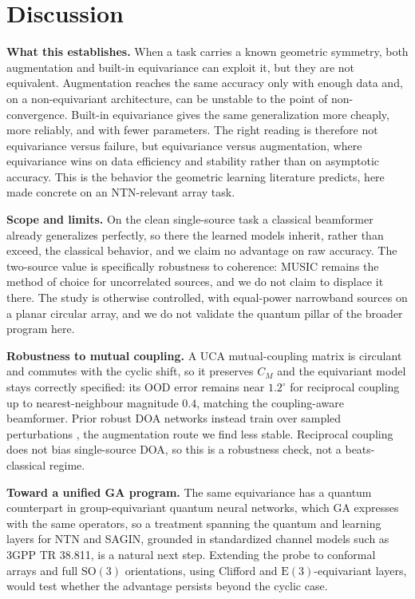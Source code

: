 \documentclass[conference]{IEEEtran}
\begin{document}
\section{Discussion}
\textbf{What this establishes.} When a task carries a known geometric symmetry,
both augmentation and built-in equivariance can exploit it, but they are not
equivalent. Augmentation reaches the same accuracy only with enough data and, on a
non-equivariant architecture, can be unstable to the point of non-convergence.
Built-in equivariance gives the same generalization more cheaply, more reliably,
and with fewer parameters. The right reading is therefore not equivariance versus
failure, but equivariance versus augmentation, where equivariance wins on data
efficiency and stability rather than on asymptotic accuracy. This is the behavior
the geometric learning literature predicts, here made concrete on an NTN-relevant
array task.

\textbf{Scope and limits.} On the clean single-source task a classical beamformer
already generalizes perfectly, so there the learned models inherit, rather than
exceed, the classical behavior, and we claim no advantage on raw accuracy. The
two-source value is specifically robustness to coherence: MUSIC remains the method of
choice for uncorrelated sources, and we do not claim to displace it there. The study
is otherwise controlled, with equal-power narrowband sources on a planar circular
array, and we do not validate the quantum pillar of the broader program here.

\textbf{Robustness to mutual coupling.} A UCA mutual-coupling matrix is circulant
and commutes with the cyclic shift, so it preserves $C_M$ and the equivariant model
stays correctly specified: its OOD error remains near $1.2^\circ$ for reciprocal
coupling up to nearest-neighbour magnitude $0.4$, matching the coupling-aware
beamformer. Prior robust DOA networks instead train over sampled perturbations
\cite{liu2018,sdoanet2024}, the augmentation route we find less stable. Reciprocal
coupling does not bias single-source DOA, so this is a robustness check, not a
beats-classical regime.

\textbf{Toward a unified GA program.} The same equivariance has a quantum
counterpart in group-equivariant quantum neural networks, which GA expresses with
the same operators, so a treatment spanning the quantum and learning layers for NTN
and SAGIN, grounded in standardized channel models such as 3GPP TR 38.811, is a
natural next step. Extending the probe to conformal arrays and full
$\mathrm{SO}(3)$ orientations, using Clifford and $\mathrm{E}(3)$-equivariant
layers, would test whether the advantage persists beyond the cyclic case.
\end{document}
